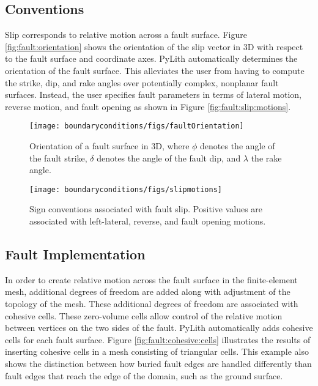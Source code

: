 \subsection{Conventions}

Slip corresponds to relative motion across a fault surface. Figure
\vref{fig:fault:orientation} shows the orientation of the slip vector
in 3D with respect to the fault surface and coordinate axes. PyLith
automatically determines the orientation of the fault surface. This
alleviates the user from having to compute the strike, dip, and rake
angles over potentially complex, nonplanar fault surfaces. Instead,
the user specifies fault parameters in terms of lateral motion, reverse
motion, and fault opening as shown in Figure \vref{fig:fault:slip:motions}.

\begin{figure}[htbp]
  \texttt{[image: boundaryconditions/figs/faultOrientation]}
  \caption{Orientation of a fault surface in 3D, where $\phi$ denotes the angle
    of the fault strike, $\delta$ denotes the angle of the fault dip,
    and $\lambda$ the rake angle.}
  \label{fig:fault:orientation} 
\end{figure}

\begin{figure}[htbp]
  \texttt{[image: boundaryconditions/figs/slipmotions]}
  \caption{Sign conventions associated with fault slip. Positive values are associated
    with left-lateral, reverse, and fault opening motions.}
  \label{fig:fault:slip:motions} 
\end{figure}

\subsection{Fault Implementation}

In order to create relative motion across the fault surface in the
finite-element mesh, additional degrees of freedom are added along
with adjustment of the topology of the mesh. These additional degrees
of freedom are associated with cohesive cells. These zero-volume cells
allow control of the relative motion between vertices on the two sides
of the fault. PyLith automatically adds cohesive cells for each fault
surface. Figure \vref{fig:fault:cohesive:cells} illustrates the results
of inserting cohesive cells in a mesh consisting of triangular cells.
This example also shows the distinction between how buried fault edges
are handled differently than fault edges that reach the edge of the
domain, such as the ground surface.

